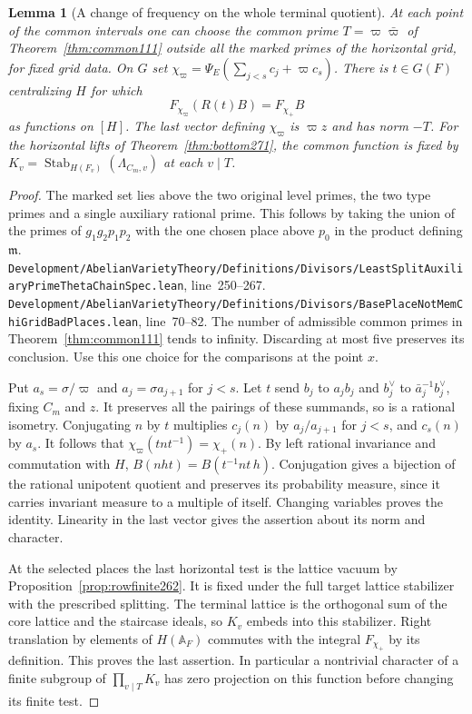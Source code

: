 \documentclass[a4paper,11pt]{article}
\newtheorem{lemma}[proposition]{Lemma}
\theoremstyle{definition}
\theoremstyle{remark}
\newcommand{\srcloc}[2]{{\small\nolinkurl{#1.lean}}, line~#2}
\numberwithin{equation}{section}
\begin{document}
\begin{lemma}[A change of frequency on the whole terminal quotient]\leavevmode
\label{lem:flag272}
At each point of the common intervals one can choose the common
prime \(T=\varpi\bar\varpi\) of Theorem~\ref{thm:common111} outside
all the marked primes of the horizontal grid, for fixed grid data.
On \(G\) set \(\chi_\varpi=\Psi_E(\sum_{j<s}c_j+\varpi c_s)\).
There is \(t\in G(F)\) centralizing \(H\) for which
\[
                   F_{\chi_\varpi}(R(t)B)=F_{\chi_+}B
\]
as functions on \([H]\). The last vector defining \(\chi_\varpi\)
is \(\varpi z\) and has norm \(-T\).
For the horizontal lifts of Theorem~\ref{thm:bottom271}, the common
function is fixed by \(K_v=\operatorname{Stab}_{H(F_v)}
(\Lambda_{C_m,v})\) at each \(v\mid T\).
\end{lemma}
\begin{proof}
The marked set lies above the two original level primes, the two
type primes and a single auxiliary rational prime. This follows by
taking the union of the primes of \(g_1g_2p_1p_2\) with the one
chosen place above \(p_0\) in the product defining \(\mathfrak m\).
\srcloc{Development/AbelianVarietyTheory/Definitions/Divisors/LeastSplitAuxiliaryPrimeThetaChainSpec}{250--267}.
\srcloc{Development/AbelianVarietyTheory/Definitions/Divisors/BasePlaceNotMemChiGridBadPlaces}{70--82}.
The number of admissible common primes in
Theorem~\ref{thm:common111} tends to infinity. Discarding at
most five preserves its conclusion. Use this one choice for
the comparisons at the point \(x\).

Put \(a_s=\sigma/\varpi\) and \(a_j=\sigma a_{j+1}\) for \(j<s\).
Let \(t\) send \(b_j\) to \(a_j b_j\) and \(b_j^\vee\) to
\(\bar a_j^{-1}b_j^\vee\), fixing \(C_m\) and \(z\). It preserves
all the pairings of these summands, so is a rational isometry.
Conjugating \(n\) by \(t\) multiplies \(c_j(n)\) by
\(a_j/a_{j+1}\) for \(j<s\), and \(c_s(n)\) by \(a_s\).
It follows that \(\chi_\varpi(tnt^{-1})=\chi_+(n)\).
By left rational invariance and commutation with \(H\),
\(B(nht)=B(t^{-1}nt\,h)\). Conjugation gives a bijection of
the rational unipotent quotient and preserves its probability
measure, since it carries invariant measure to a multiple of
itself. Changing variables proves the identity. Linearity in the
last vector gives the assertion about its norm and character.

At the selected places the last horizontal test is the lattice
vacuum by Proposition~\ref{prop:rowfinite262}. It is fixed under
the full target lattice stabilizer with the prescribed splitting.
The terminal lattice is the orthogonal sum of the core lattice
and the staircase ideals, so \(K_v\) embeds into this stabilizer.
Right translation by elements of \(H(\mathbb A_F)\) commutes with
the integral \(F_{\chi_+}\) by its definition. This proves the
last assertion. In particular a nontrivial character of a finite
subgroup of \(\prod_{v\mid T}K_v\) has zero projection on this
function before changing its finite test.
\end{proof}
\end{document}

